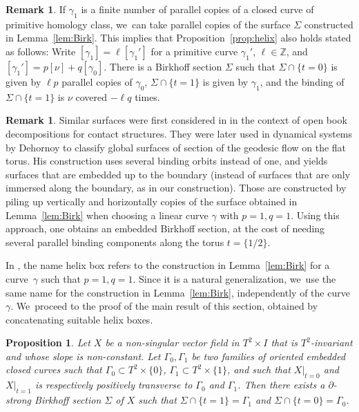 \documentclass[11pt]{article}
\newtheorem{prop}[theorem]{Proposition}
\theoremstyle{definition}
\newtheorem{Remark}[theorem]{Remark}
\begin{document}
\begin{Remark}\label{rem:Multcurv}
If $\gamma_1$ is a finite number of parallel copies of a closed curve of primitive homology class, we~can take parallel copies of the surface $\Sigma$ constructed in Lemma~\ref{lem:Birk}. This implies that Proposition~\ref{prop:helix} also holds stated as follows: Write $[\gamma_1]=\ell [\gamma_1']$ for a primitive curve $\gamma_1'$, $\ell \in \mathbb{Z}$, and $[\gamma_1']=p[\nu] + q [\gamma_0]$. There is a Birkhoff section $\Sigma$ such that $\Sigma\cap \{t=0\}$ is given by $\ell p$ parallel copies of $\gamma_0$, $\Sigma\cap \{t=1\}$ is given by $\gamma_1$, and the binding of $\Sigma\cap \{t=1\}$ is $\nu$ covered $-\ell q$ times.
\end{Remark}

\begin{Remark}\label{rem:embDeh}
Similar surfaces were first considered in \cite{VHM} in the context of open book decompositions for contact structures. They were later used in dynamical systems by Dehornoy \cite{Deh, Deh2} to classify global surfaces of section of the geodesic flow on the flat torus. His construction uses several binding orbits instead of one, and yields surfaces that are embedded up to the boundary (instead of surfaces that are only immersed along the boundary, as in our construction). Those are constructed by piling up vertically and horizontally copies of the surface obtained in Lemma~\ref{lem:Birk} when choosing a linear curve $\gamma$ with $p=1,q=1$. Using this approach, one obtains an embedded Birkhoff section, at the cost of needing several parallel binding components along the torus $t=\{1/2\}$.

In \cite{Deh, Deh2}, the name helix box refers to the construction in Lemma~\ref{lem:Birk} for a curve~$\gamma$ such that $p=1,q=1$. Since it is a natural generalization, we~use the same name for the construction in Lemma~\ref{lem:Birk}, independently of the curve $\gamma$. We~proceed to the proof of the main result of this section, obtained by concatenating suitable helix boxes.
\end{Remark}

\begin{prop}\label{prop:BirkT2}
Let $X$ be a non-singular vector field in $T^2\times I$ that is $T^2$-invariant and whose slope is non-constant. Let $\Gamma_0,\Gamma_1$ be two families of oriented embedded closed curves such that $\Gamma_0 \subset T^2\times \{0\}$, $\Gamma_1\subset T^2\times \{1\}$, and such that $X|_{t=0}$ and $X|_{t=1}$ is respectively positively transverse to $\Gamma_0$ and $\Gamma_1$. Then there exists a $\partial$-strong Birkhoff section $\Sigma$ of $X$ such that $\Sigma \cap \{t=1\}=\Gamma_1$ and $\Sigma \cap \{t=0\}=\Gamma_0$.
\end{prop}
\end{document}
